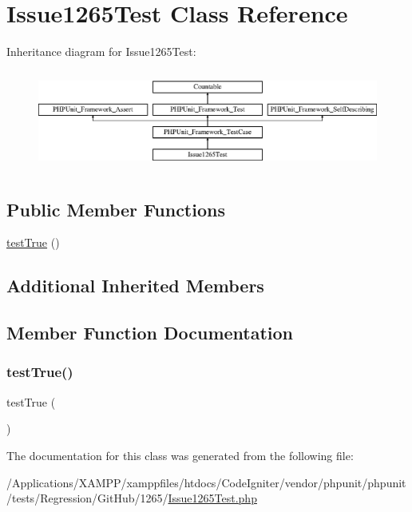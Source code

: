 \hypertarget{class_issue1265_test}{}\section{Issue1265\+Test Class Reference}
\label{class_issue1265_test}
Inheritance diagram for Issue1265\+Test\+:\begin{figure}[H]
\begin{center}
\leavevmode
\includegraphics[height=3.303835cm]{class_issue1265_test}
\end{center}
\end{figure}
\subsection*{Public Member Functions}
\begin{DoxyCompactItemize}
\item 
\mbox{\hyperlink{class_issue1265_test_a8cf315558f7f8c04df48a73b4f752f4b}{test\+True}} ()
\end{DoxyCompactItemize}
\subsection*{Additional Inherited Members}


\subsection{Member Function Documentation}
\mbox{\label{class_issue1265_test_a8cf315558f7f8c04df48a73b4f752f4b}} 
\subsubsection{\texorpdfstring{test\+True()}{testTrue()}}
{\footnotesize\ttfamily test\+True (\begin{DoxyParamCaption}{ }\end{DoxyParamCaption})}



The documentation for this class was generated from the following file\+:\begin{DoxyCompactItemize}
\item 
/\+Applications/\+X\+A\+M\+P\+P/xamppfiles/htdocs/\+Code\+Igniter/vendor/phpunit/phpunit/tests/\+Regression/\+Git\+Hub/1265/\mbox{\hyperlink{_issue1265_test_8php}{Issue1265\+Test.\+php}}\end{DoxyCompactItemize}
